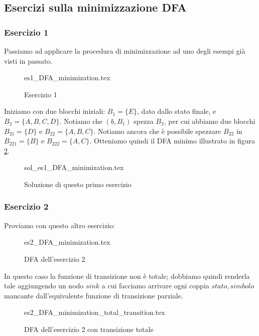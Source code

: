 \documentclass[class=book, crop=false, oneside, 12pt]{standalone}
\begin{document}
\subsection{Esercizi sulla minimizzazione DFA}
\subsubsection{Esercizio 1}
Passiamo ad applicare la procedura di minimizzazione ad uno degli esempi già visti in passato.

\begin{figure}[H]
	\centering
    {es1_DFA_minimization.tex}
	\caption{Esercizio 1}
	\label{mindfa-es-1}
\end{figure}

Iniziamo con due blocchi iniziali: \(B_{1}=\{E\}\), dato dallo stato finale, e \(B_{2}=\{A,B,C,D\}\). Notiamo che \((b,B_{1})\) spezza \(B_{2}\), per cui abbiamo due blocchi \(B_{21}=\{D\}\) e \(B_{22}=\{A,B,C\}\). Notiamo ancora che è possibile spezzare \(B_{22}\) in \(B_{221}=\{B\}\) e \(B_{222}=\{A,C\}\). Otteniamo quindi il DFA minimo illustrato in figura \ref{mindfa-es1-sol}. 

\begin{figure}[H]
	\centering
    {sol_es1_DFA_minimization.tex}
	\caption{Soluzione di questo primo esercizio}
  \label{mindfa-es1-sol}
\end{figure}

\subsubsection{Esercizio 2}
Proviamo con questo altro esercizio:

\begin{figure}[H]
	\centering
    {es2_DFA_minimization.tex}
	\caption{DFA dell'esercizio 2}
  \label{mindfa-es-2}
\end{figure}

In questo caso la funzione di transizione non è totale; dobbiamo quindi renderla tale aggiungendo un nodo \(sink\) a cui facciamo arrivare ogni coppia \(stato, simbolo\) mancante dall'equivalente funzione di transizione parziale.

\begin{figure}[H]
	\centering
    {es2_DFA_minimization_total_transition.tex}
	\caption{DFA dell'esercizio 2 con transizione totale}
  \label{minndfa-es-2-tot}
\end{figure}
\end{document}
